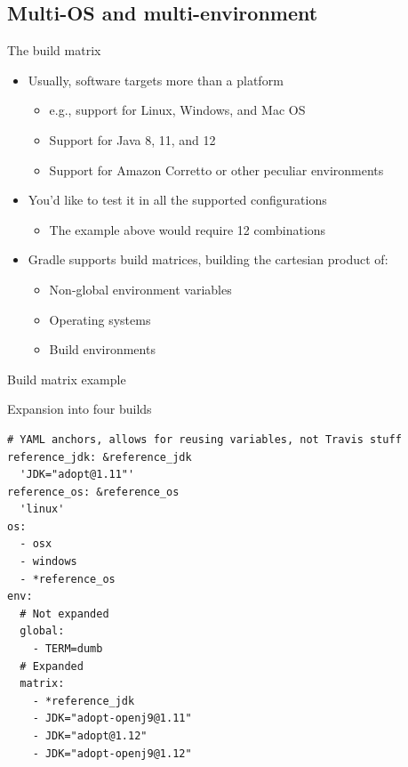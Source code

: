 \documentclass[presentation]{beamer}
\begin{document}
\subsection{Multi-OS and multi-environment}

\begin{frame}{The build matrix}
    \begin{itemize}
        \item Usually, software targets more than a platform
        \begin{itemize}
            \item e.g., support for Linux, Windows, and Mac OS
            \item Support for Java 8, 11, and 12
            \item Support for Amazon Corretto or other peculiar environments
        \end{itemize}
        \item You'd like to test it in all the supported configurations
        \begin{itemize}
            \item The example above would require 12 combinations
        \end{itemize}
        \item Gradle supports build matrices, building the cartesian product of:
        \begin{itemize}
            \item Non-global environment variables
            \item Operating systems
            \item Build environments
        \end{itemize}
    \end{itemize}
\end{frame}

\begin{frame}[fragile]{Build matrix example}
    \begin{block}{Expansion into four builds}
        \begin{verbatim}
# YAML anchors, allows for reusing variables, not Travis stuff
reference_jdk: &reference_jdk
  'JDK="adopt@1.11"'
reference_os: &reference_os
  'linux'
os:
  - osx
  - windows
  - *reference_os
env:
  # Not expanded
  global:
    - TERM=dumb
  # Expanded
  matrix:
    - *reference_jdk
    - JDK="adopt-openj9@1.11"
    - JDK="adopt@1.12"
    - JDK="adopt-openj9@1.12"
        \end{verbatim}
    \end{block}
\end{frame}
\end{document}
